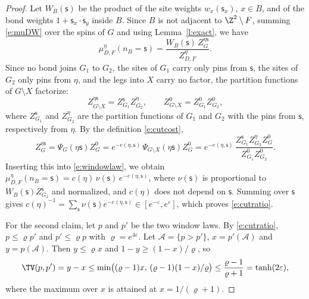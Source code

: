 \begin{proof}
Let $W_B(\mathsf s)$ be the product of the site weights $w_x(\mathsf s_x)$, $x \in B$, and of the bond weights $1 + \mathsf s_x \cdot \mathsf s_y$ inside $B$. Since $B$ is not adjacent to $\Z^2 \setminus F$, summing \eqref{e:muDW} over the spins of $G$ and using Lemma~\ref{l:exact}, we have
\begin{equation}\label{e:windowlaw}
\mu^\eta_{D, F}(n_B = \mathsf s) = \frac{W_B(\mathsf s) \, Z^{\eta \mathsf s}_G}{Z^\eta_{D, F}} .
\end{equation}
Since no bond joins $G_1$ to $G_2$, the sites of $G_1$ carry only pins from $\mathsf s$, the sites of $G_2$ only pins from $\eta$, and the legs into $X$ carry no factor, the partition functions of $G \setminus X$ factorize:
\begin{equation*}
Z^{\eta \mathsf s}_{G \setminus X} = Z^{\mathsf s}_{G_1} Z^{\eta}_{G_2}, \qquad Z^0_{G \setminus X} = Z^0_{G_1} Z^0_{G_2},
\end{equation*}
where $Z^{\mathsf s}_{G_1}$ and $Z^\eta_{G_2}$ are the partition functions of $G_1$ and $G_2$ with the pins from $\mathsf s$, respectively from $\eta$. By the definition \eqref{e:cutcost},
\begin{equation*}
Z^{\eta \mathsf s}_G = \Psi_G(\eta \mathsf s) Z^0_G = e^{-e(\eta, \mathsf s)} \, \Psi_{G \setminus X}(\eta \mathsf s) Z^0_G = e^{-e(\eta, \mathsf s)} \, \frac{Z^{\mathsf s}_{G_1} Z^\eta_{G_2} Z^0_G}{Z^0_{G_1} Z^0_{G_2}} .
\end{equation*}
Inserting this into \eqref{e:windowlaw}, we obtain $\mu^\eta_{D, F}(n_B = \mathsf s) = c(\eta) \, \nu(\mathsf s) \, e^{-e(\eta, \mathsf s)}$, where $\nu(\mathsf s)$ is proportional to $W_B(\mathsf s) Z^{\mathsf s}_{G_1}$ and normalized, and $c(\eta)$ does not depend on $\mathsf s$. Summing over $\mathsf s$ gives $c(\eta)^{-1} = \sum_{\mathsf s} \nu(\mathsf s) e^{-e(\eta, \mathsf s)} \in [e^{-\varepsilon}, e^{\varepsilon}]$, which proves \eqref{e:cutratio}.

For the second claim, let $p$ and $p'$ be the two window laws. By \eqref{e:cutratio}, $p \le \varrho p'$ and $p' \le \varrho p$ with $\varrho = e^{4 \varepsilon}$. Let $\mathcal A = \{p > p'\}$, $x = p'(\mathcal A)$ and $y = p(\mathcal A)$. Then $y \le \varrho x$ and $1 - y \ge (1 - x)/\varrho$, so
\begin{equation*}
\TV(p, p') = y - x \le \min\bigl( (\varrho - 1) x, \, (\varrho - 1)(1 - x)/\varrho \bigr) \le \frac{\varrho - 1}{\varrho + 1} = \tanh(2 \varepsilon),
\end{equation*}
where the maximum over $x$ is attained at $x = 1/(\varrho + 1)$.
\end{proof}

